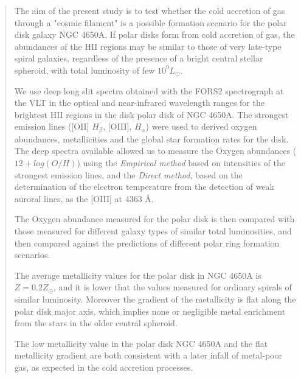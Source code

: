 \documentclass[12pt,preprint]{aastex}
\begin{document}
\begin{abstract}

The aim of the present study is to test whether the cold accretion of
gas through a "cosmic filament" \citep{Mac06} is a possible formation
scenario for the polar disk galaxy NGC 4650A. If polar disks form from
cold accretion of gas, the abundances of the HII regions may be
similar to those of very late-type spiral galaxies, regardless of the
presence of a bright central stellar spheroid, with total luminosity
of few $10^{9} L_{\odot}$.

We use deep long slit spectra obtained with the FORS2 spectrograph at
the VLT in the optical and near-infrared wavelength ranges for the
brightest HII regions in the disk polar disk of NGC 4650A. The
strongest emission lines ([OII] $H_{\beta}$, [OIII], $H_{\alpha}$) were used
to derived oxygen abundances, metallicities and the global star
formation rates for the disk.  The deep spectra available allowed us
to measure the Oxygen abundances ($12 + log (O/H)$) using the {\it
  Empirical method} based on intensities of the strongest emission
lines, and the {\it Direct method}, based on the determination of the
electron temperature from the detection of weak auroral lines, as the
[OIII] at 4363 \AA.

The Oxygen abundance measured for the polar disk is then compared with
those measured for different galaxy types of similar total
luminosities, and then compared against the predictions of different
polar ring formation scenarios.

The average metallicity values for the polar disk in NGC 4650A is
$Z=0.2 Z_{\odot}$, and it is lower that the values measured for
ordinary spirals of similar luminosity. Moreover the gradient of the
metallicity is flat along the polar disk major axis, which implies
none or negligible metal enrichment from the stars in the older
central spheroid.

The low metallicity value in the polar disk NGC 4650A and the flat
metallicity gradient are both consistent with a later infall of
metal-poor gas, as expected in the cold accretion processes.

\end{abstract}

\end{document}
